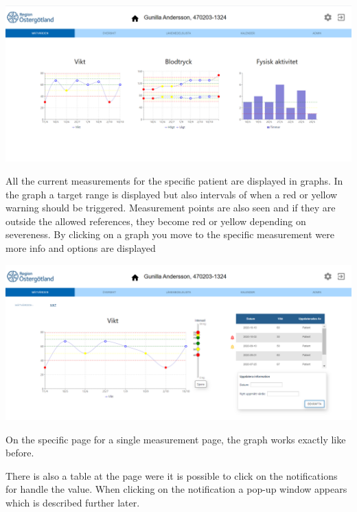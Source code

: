 \begin{center}
    \includegraphics[width=\linewidth]{images/single_patient_measurement_overview_image.png}
    \label{fig:figures}
\end{center}
All the current measurements for the specific patient are displayed in graphs. In the graph a target range is displayed but also intervals of when a red or yellow warning should be triggered. Measurement points are also seen and if they are outside the allowed references, they become red or yellow depending on severeness. By clicking on a graph you move to the specific measurement were more info and options are displayed
\\

\begin{center}
    \includegraphics[width=\linewidth]{images/single_patient_weight_measurements_image.png}
    \label{fig:figures}
\end{center}
On the specific page for a single measurement page, the graph works exactly like before. 

There is also a table at the page were it is possible to click on the notifications for handle the value. When clicking on the notification a pop-up window appears which is described further later. 

